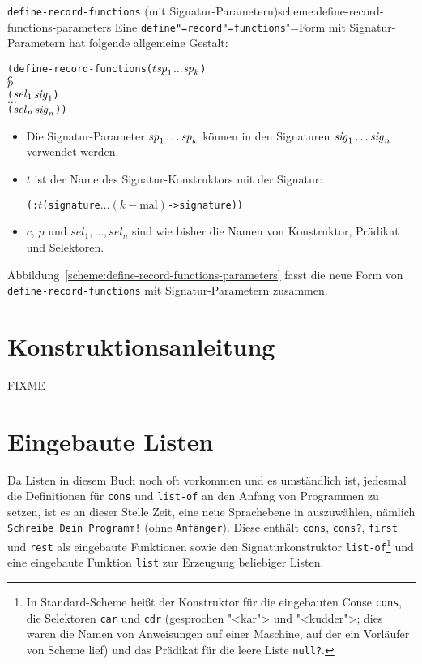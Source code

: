 \begin{feature}{\texttt{define-record-functions} (mit Signatur-Parametern)}{scheme:define-record-functions-parameters}
Eine \texttt{define"=record"=functions}"=Form
mit Signatur-Parametern hat folgende allgemeine Gestalt:\label{def:define-record-functions-parameters}
%
\begin{alltt}
(define-record-functions (\(t\) \(\mathit{sp}\sb{1}\) \(\ldots\) \(\mathit{sp}\sb{k}\))
  \(c\)
  \(p\)
  (\(\mathit{sel}\sb{1}\) \(\mathit{sig}\sb{1}\))
  \(\ldots\)
  (\(\mathit{sel}\sb{n}\) \(\mathit{sig}\sb{n}\)))
\end{alltt}
%
%
\begin{itemize}
\item Die Signatur-Parameter $\mathit{sp}\sb{1} \ldots \mathit{sp}\sb{k}$
können in den Signaturen
\(\mathit{sig}\sb{1}\ldots\mathit{sig}\sb{n}\) verwendet werden.
\item $t$ ist der Name des Signatur-Konstruktors mit der Signatur:
\begin{alltt}
(: \(t\) (signature $\ldots$ \((k-\textrm{mal})\) -> signature))
\end{alltt}
  \item $c$, $p$ und $\mathit{sel}_1, \ldots, \mathit{sel}_n$ sind wie
    bisher die Namen von Konstruktor, Prädikat und Selektoren.
\end{itemize}
%
\end{feature}

Abbildung~\ref{scheme:define-record-functions-parameters} fasst die
neue Form von \lstinline{define-record-functions} mit
Signatur-Parametern zusammen.

\section{Konstruktionsanleitung}

FIXME

\section{Eingebaute Listen}

Da Listen in diesem Buch noch oft vorkommen und es umständlich
ist, jedesmal die Definitionen für \texttt{cons} und \texttt{list-of} an den Anfang
von Programmen zu setzen, ist es an dieser Stelle Zeit, eine neue
Sprachebene in \drscheme{} auszuwählen, nämlich \texttt{Schreibe Dein Programm!}
(ohne \texttt{Anfänger}).  Diese enthält \texttt{cons},
\texttt{cons?}, \texttt{first} und \texttt{rest} als eingebaute
Funktionen sowie den Signaturkonstruktor \texttt{list-of}\footnote{In Standard-Scheme heißt der Konstruktor für
  die eingebauten Conse \texttt{cons}, die
  Selektoren \texttt{car} und \texttt{cdr}
  (gesprochen "<kar"> und "<kudder">; dies waren die Namen von Anweisungen auf einer
  Maschine, auf der ein Vorläufer von Scheme lief) und das Prädikat
  für die leere Liste \texttt{null?}.} und eine
eingebaute Funktion \texttt{list} zur Erzeugung beliebiger Listen.

